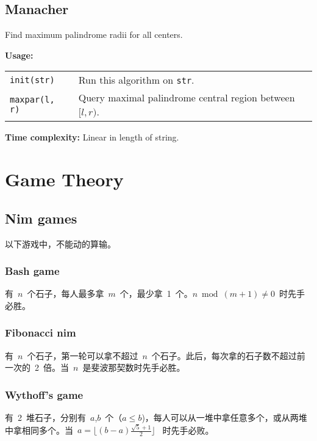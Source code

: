 \subsection{Manacher}
Find maximum palindrome radii for all centers. \par
\textbf{Usage:} \\[0.1cm]
\begin{tabular}{p{2.5cm} p{9cm}}
  \lstinline|init(str)| & Run this algorithm on \lstinline|str|.  \\
  \lstinline|maxpar(l, r)| & Query maximal palindrome central region between $[l, r)$. \\
\end{tabular} \par
\textbf{Time complexity:} Linear in length of string. \par


\section{Game Theory}
\subsection{Nim games}
以下游戏中，不能动的算输。
\subsubsection{Bash game}
有~$n$~个石子，每人最多拿~$m$~个，最少拿~1~个。$n \bmod (m+1) \neq 0$~时先手必胜。
\subsubsection{Fibonacci nim}
有~$n$~个石子，第一轮可以拿不超过~$n$~个石子。此后，每次拿的石子数不超过前一次的~2~倍。当~$n$~是斐波那契数时先手必胜。
\subsubsection{Wythoff's game}
有~2~堆石子，分别有~$a$,$b$~个（$a \leq b$)，每人可以从一堆中拿任意多个，或从两堆中拿相同多个。当~$a = \lfloor (b-a)\frac{\sqrt{5}+1}{2} \rfloor$~ 时先手必败。


